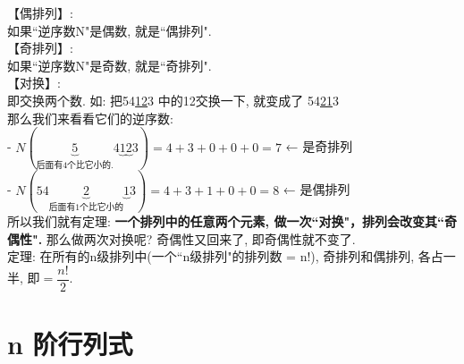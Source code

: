 \documentclass[UTF8]{ctexart}
\begin{document}
	
	【偶排列】:\\
	如果``逆序数N"是偶数, 就是``偶排列". \\
	
	
	【奇排列】:\\
	如果``逆序数N"是奇数, 就是``奇排列".	\\
	
	【对换】:\\
	即交换两个数. 如: 把54\underline{12}3 中的12交换一下, 就变成了 54\underline{21}3 \\
	那么我们来看看它们的逆序数:\\
	- $N\left( \underset{\text{后面有4个比它小的}.}{\underbrace{5}}4\underset{}{\underbrace{1}}\underset{}{\underbrace{2}}3 \right) =4+3+0+0+0=7	$ ← 是奇排列\\
	- $N\left( 54\underset{\text{后面有1个比它小的}}{\underbrace{2}}\underset{}{\underbrace{1}}3 \right) =4+3+1+0+0=8		$ ← 是偶排列\\
	
	所以我们就有定理: \textbf{一个排列中的任意两个元素, 做一次``对换"，排列会改变其``奇偶性".} 那么做两次对换呢? 奇偶性又回来了, 即奇偶性就不变了. \\
	
	定理: 在所有的n级排列中(一个``n级排列"的排列数 = n!), 奇排列和偶排列, 各占一半, 即$=\dfrac{n!}{2}$.\\
	
	
	
	
	\section{n 阶行列式}
	
\end{document}
